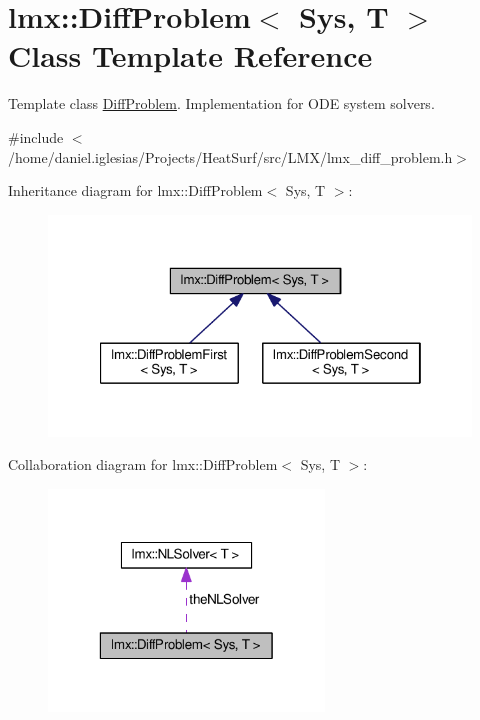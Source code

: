 \hypertarget{classlmx_1_1DiffProblem}{\section{lmx\-:\-:Diff\-Problem$<$ Sys, T $>$ Class Template Reference}
\label{classlmx_1_1DiffProblem}
}


Template class \hyperlink{classlmx_1_1DiffProblem}{Diff\-Problem}. Implementation for O\-D\-E system solvers.  




{\ttfamily \#include $<$/home/daniel.\-iglesias/\-Projects/\-Heat\-Surf/src/\-L\-M\-X/lmx\-\_\-diff\-\_\-problem.\-h$>$}



Inheritance diagram for lmx\-:\-:Diff\-Problem$<$ Sys, T $>$\-:
\nopagebreak
\begin{figure}[H]
\begin{center}
\leavevmode
\includegraphics[width=321pt]{classlmx_1_1DiffProblem__inherit__graph}
\end{center}
\end{figure}


Collaboration diagram for lmx\-:\-:Diff\-Problem$<$ Sys, T $>$\-:
\nopagebreak
\begin{figure}[H]
\begin{center}
\leavevmode
\includegraphics[width=208pt]{classlmx_1_1DiffProblem__coll__graph}
\end{center}
\end{figure}
